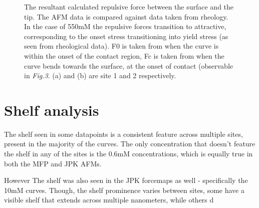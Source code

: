 \begin{figure}[!tbph!!!]
  \centering
  \hfill
  \caption{The resultant calculated repulsive force between the surface and the tip. The AFM data is compared against data taken from rheology. In the case of 550mM the repulsive forces transition to attractive, corresponding to the onset stress transitioning into yield stress (as seen from rheological data). F0 is taken from when the curve is within the onset of the contact region, Fc is taken from when the curve bends towards the surface, at the onset of contact (observable in \textit{Fig.3}. (a) and (b) are site 1 and 2 respectively\cite{John}.}
\end{figure}

\section{Shelf analysis}

The shelf seen in some datapoints is a consistent feature across multiple sites, present in the majority of the curves. The only concentration that doesn't feature the shelf in any of the sites is the 0.6mM concentrations, which is equally true in both the MFP and JPK AFMs.

However The shelf was also seen in the JPK forcemaps as well - specifically the 10mM curves. Though, the shelf prominence varies between sites, some have a visible shelf that extends across multiple nanometers, while others d

